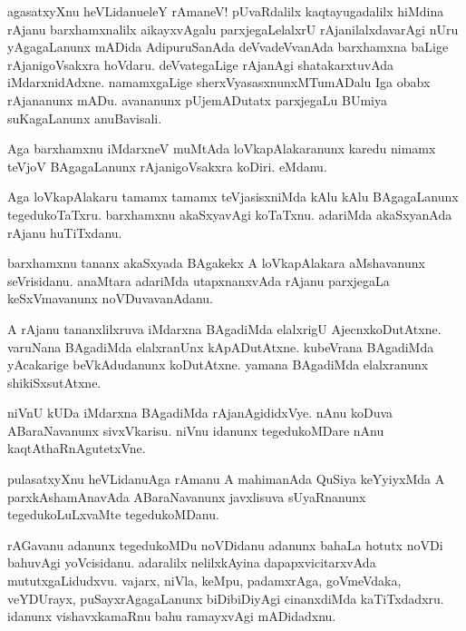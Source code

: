 \begin{mng}
agasatxyXnu heVLidanu\mdash eleY rAmaneV! pUvaRdalilx kaqtayugadalilx hiMdina rAjanu barxhamxnalilx aikayxvAgalu parxjegaLelalxrU rAjanilalxdavarAgi nUru yAgagaLanunx mADida AdipuruSanAda deVvadeVvanAda barxhamxna baLige rAjanigoVsakxra hoVdaru. deVvategaLige rAjanAgi shatakarxtuvAda iMdarxnidAdxne. namamxgaLige sherxVyasasxnunxMTumADalu Iga obabx rAjananunx mADu. avananunx pUjemADutatx parxjegaLu BUmiya suKagaLanunx anuBavisali.
\end{mng}

\begin{mng}
Aga barxhamxnu iMdarxneV muMtAda loVkapAlakaranunx karedu nimamx teVjoV BAgagaLanunx rAjanigoVsakxra koDiri. eMdanu.
\end{mng}

\begin{mng}
Aga loVkapAlakaru tamamx tamamx teVjasisxniMda kAlu kAlu BAgagaLanunx tegedukoTaTxru. barxhamxnu akaSxyavAgi koTaTxnu. adariMda akaSxyanAda rAjanu huTiTxdanu.
\end{mng}

\begin{mng}
barxhamxnu tananx akaSxyada BAgakekx A loVkapAlakara aMshavanunx seVrisidanu. anaMtara adariMda utapxnanxvAda rAjanu parxjegaLa keSxVmavanunx noVDuvavanAdanu.
\end{mng}

\begin{mng}
A rAjanu tananxlilxruva iMdarxna BAgadiMda elalxrigU AjecnxkoDutAtxne. varuNana BAgadiMda elalxranUnx kApADutAtxne. kubeVrana BAgadiMda yAcakarige beVkAdudanunx koDutAtxne. yamana BAgadiMda elalxranunx shikiSxsutAtxne.
\end{mng}

\begin{mng}
niVnU kUDa iMdarxna BAgadiMda rAjanAgididxVye. nAnu koDuva ABaraNavanunx sivxVkarisu. niVnu idanunx tegedukoMDare nAnu kaqtAthaRnAgutetxVne.
\end{mng}

\begin{mng}
pulasatxyXnu heVLidanu\mdash Aga rAmanu A mahimanAda QuSiya keYyiyxMda A parxkAshamAnavAda ABaraNavanunx javxlisuva sUyaRnanunx tegedukoLuLxvaMte tegedukoMDanu.
\end{mng}

\begin{mng}
rAGavanu adanunx tegedukoMDu noVDidanu adanunx bahaLa hotutx noVDi bahuvAgi yoVcisidanu. adaralilx nelilxkAyina dapapxvicitarxvAda mututxgaLidudxvu. vajarx, niVla, keMpu, padamxrAga, goVmeVdaka, veYDUrayx, puSayxrAgagaLanunx biDibiDiyAgi cinanxdiMda kaTiTxdadxru. idanunx vishavxkamaRnu bahu ramayxvAgi mADidadxnu.
\end{mng}

